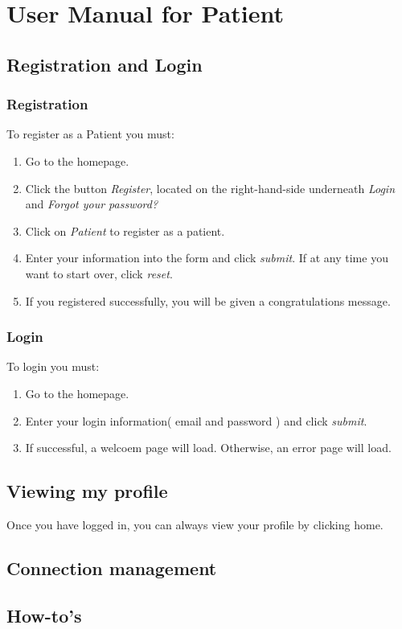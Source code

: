 \documentclass[12pt]{report}
\begin{document}
\chapter{User Manual for Patient}
\section{Registration and Login}
\subsection{Registration}
To register as a Patient you must:
\begin{enumerate}
\item Go to the homepage.
\item Click the button \textit{Register}, located on the right-hand-side underneath \textit{Login} and \textit{Forgot your password?}
\item Click on \textit{Patient} to register as a patient.
\item Enter your information into the form and click \textit{submit}. If at any time you want to start over, click \textit{reset}.
\item If you registered successfully, you will be given a congratulations message.
\end{enumerate}

\subsection{Login}
To login you must:
\begin{enumerate}
\item Go to the homepage.
\item Enter your login information( email and password ) and click \textit{submit}.
\item If successful, a welcoem page will load. Otherwise, an error page will load. 
\end{enumerate}
\section{Viewing my profile}
Once you have logged in, you can always view your profile by clicking home.
\section{Connection management}
\section{How-to's}
\end{document}
